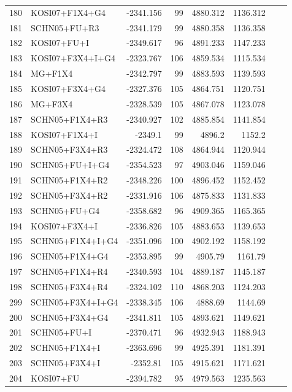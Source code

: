 \documentclass[fleqn,letterpaper]{article}
\begin{document}
\begin{longtable}{clrrrrrr}
	180 & KOSI07+F1X4+G4 & -2341.156 & 99 & 4880.312 & 1136.312 \\ 
	181 & SCHN05+FU+R3 & -2341.179 & 99 & 4880.358 & 1136.358 \\ 
	182 & KOSI07+FU+I & -2349.617 & 96 & 4891.233 & 1147.233 \\ 
	183 & KOSI07+F3X4+I+G4 & -2323.767 & 106 & 4859.534 & 1115.534 \\ 
	184 & MG+F1X4 & -2342.797 & 99 & 4883.593 & 1139.593 & \\ 
	185 & KOSI07+F3X4+G4 & -2327.376 & 105 & 4864.751 & 1120.751 \\ 
	186 & MG+F3X4 & -2328.539 & 105 & 4867.078 & 1123.078 \\ 
	187 & SCHN05+F1X4+R3 & -2340.927 & 102 & 4885.854 & 1141.854 \\ 
	188 & KOSI07+F1X4+I & -2349.1 & 99 & 4896.2 & 1152.2 & \\ 
	189 & SCHN05+F3X4+R3 & -2324.472 & 108 & 4864.944 & 1120.944 \\ 
	190 & SCHN05+FU+I+G4 & -2354.523 & 97 & 4903.046 & 1159.046 \\ 
	191 & SCHN05+F1X4+R2 & -2348.226 & 100 & 4896.452 & 1152.452 \\ 
	192 & SCHN05+F3X4+R2 & -2331.916 & 106 & 4875.833 & 1131.833 \\ 
	193 & SCHN05+FU+G4 & -2358.682 & 96 & 4909.365 & 1165.365 \\ 
	194 & KOSI07+F3X4+I & -2336.826 & 105 & 4883.653 & 1139.653 \\ 
	195 & SCHN05+F1X4+I+G4 & -2351.096 & 100 & 4902.192 & 1158.192 \\ 
	196 & SCHN05+F1X4+G4 & -2353.895 & 99 & 4905.79 & 1161.79 \\ 
	197 & SCHN05+F1X4+R4 & -2340.593 & 104 & 4889.187 & 1145.187 \\ 
	198 & SCHN05+F3X4+R4 & -2324.102 & 110 & 4868.203 & 1124.203 \\ 
	299 & SCHN05+F3X4+I+G4 & -2338.345 & 106 & 4888.69 & 1144.69 \\ 
	200 & SCHN05+F3X4+G4 & -2341.811 & 105 & 4893.621 & 1149.621 \\ 
	201 & SCHN05+FU+I & -2370.471 & 96 & 4932.943 & 1188.943 \\ 
	202 & SCHN05+F1X4+I & -2363.696 & 99 & 4925.391 & 1181.391 \\ 
	203 & SCHN05+F3X4+I & -2352.81 & 105 & 4915.621 & 1171.621 \\ 
	204 & KOSI07+FU & -2394.782 & 95 & 4979.563 & 1235.563 \\ 

\end{longtable}
\end{document}
